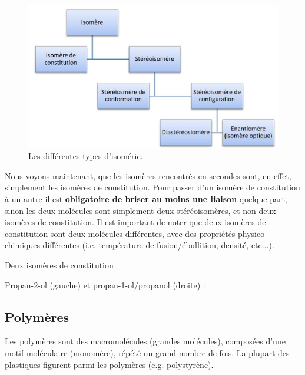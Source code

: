 \documentclass[11pt,a4paper]{article}
\begin{document}
\begin{figure}[H]
    \centering
    \includegraphics[width=0.85\linewidth]{imgs/c5/isomeres2.jpg}
    \caption{Les différentes types d'isomérie.}
\end{figure}

Nous voyons maintenant, que les isomères rencontrés en secondes sont, en effet, simplement les isomères de constitution. Pour passer d'un isomère de constitution à un autre il est \textbf{obligatoire de briser au moins une liaison} quelque part, sinon les deux molécules sont simplement deux stéréoisomères, et non deux isomères de constitution. Il est important de noter que deux isomères de constitution sont deux molécules différentes, avec des propriétés physico-chimiques différentes (i.e. température de fusion/ébullition, densité, etc...).

\begin{eg} Deux isomères de constitution

Propan-2-ol (gauche) et propan-1-ol/propanol (droite) : 
\quad \quad {}
\end{eg}

\subsection{Polymères}

Les polymères sont des macromolécules (grandes molécules), composées d'une motif moléculaire (monomère), répété un grand nombre de fois. La plupart des plastiques figurent parmi les polymères (e.g. polystyrène). 
\end{document}

